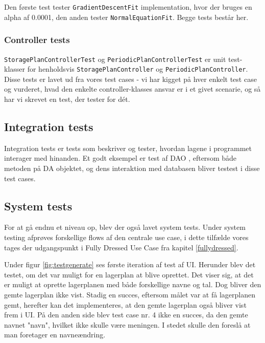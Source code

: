 Den første test tester \texttt{GradientDescentFit}\cite{GradientDescent} implementation, hvor der bruges en alpha af 0.0001, den anden tester \texttt{NormalEquationFit}\cite{NormalEquation}. Begge tests består her. 

\subsubsection{Controller tests}
\texttt{StoragePlanControllerTest} og \texttt{PeriodicPlanControllerTest} er unit test-klasser for henholdsvis \texttt{StoragePlanController} og \texttt{PeriodicPlanController}. Disse tests er lavet ud fra vores test cases - vi har kigget på hver enkelt test case og vurderet, hvad den enkelte controller-klasses ansvar er i et givet scenarie, og så har vi skrevet en test, der tester for dét.

\subsection{Integration tests}
Integration tests er tests som beskriver og tester, hvordan lagene i programmet interager med hinanden. Et godt eksempel er test af DAO \cite{DAO}, eftersom både metoden på DA objektet, og dens interaktion med databasen bliver testest i disse test cases.

\subsection{System tests}
For at gå endnu et niveau op, blev der også lavet system tests\cite{TestLevels}. Under system testing afprøves forskellige flows af den centrale use case, i dette tilfælde vores tages der udgangspunkt i Fully Dressed Use Case fra kapitel \ref{fullydressed}.

Under figur \ref{fig:testgenerate} ses første iteration af test af UI. Herunder blev det testet, om det var muligt for en lagerplan at blive oprettet. Det viser sig, at det er muligt at oprette lagerplanen med både forskellige navne og tal. Dog bliver den gemte lagerplan ikke vist. Stadig en succes, eftersom målet var at få lagerplanen gemt, herefter kan det implementeres, at den gemte lagerplan også bliver vist frem i UI. På den anden side blev test case nr. 4 ikke en succes, da den gemte navnet "navn", hvilket ikke skulle være meningen. I stedet skulle den foreslå at man foretager en navneændring.

